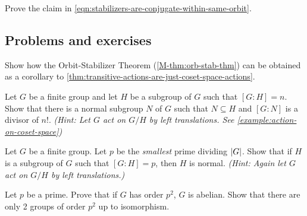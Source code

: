 \documentclass[./main.tex]{subfiles}
\begin{document}
\begin{exercise}
    Prove the claim in \cref{eqn:stabilizers-are-conjugate-within-same-orbit}.
\end{exercise}

\subsection{Problems and exercises}

\begin{exercise}
    Show how the Orbit-Stabilizer Theorem (\cref{M-thm:orb-stab-thm}) can be
    obtained as a corollary to
    \cref{thm:transitive-actions-are-just-coset-space-actions}.
\end{exercise}

\begin{exercise}
    Let $G$ be a finite group and let $H$ be a subgroup of $G$ such that $[G:H]
    = n$. Show that there is a normal subgroup $N$ of $G$ such that $N \subseteq
    H$ and $[G:N]$ is a divisor of $n!$. \textit{(Hint: Let $G$ act on $G/H$ by
    left translations. See \cref{example:action-on-coset-space})}
\end{exercise}

\begin{exercise}
    Let $G$ be a finite group. Let $p$ be the \emph{smallest} prime dividing
    $\abs G$. Show that if $H$ is a subgroup of $G$ such that $[G:H] = p$, then
    $H$ is normal. \textit{(Hint: Again let $G$ act on $G/H$ by left
    translations.)}
\end{exercise}

\begin{exercise}
    Let $p$ be a prime. Prove that if $G$ has order $p^2$, $G$ is abelian. Show
    that there are only 2 groups of order $p^2$ up to isomorphism.
\end{exercise}
\end{document}
